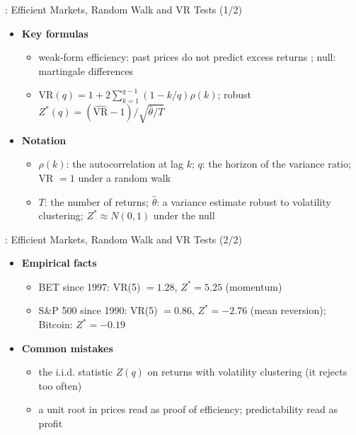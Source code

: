 \begin{frame}{: Efficient Markets, Random Walk and VR Tests (1/2)}
\itemsize{\small}
\begin{itemize}
    \item \textbf{Key formulas}
    \begin{itemize}
        \item weak-form efficiency: past prices do not predict excess returns ; null: martingale differences
        \item $\mathrm{VR}(q) = 1 + 2\sum_{k=1}^{q-1}(1 - k/q)\rho(k)$; robust $Z^*(q) = (\widehat{\mathrm{VR}} - 1)/\sqrt{\hat\theta/T}$ 
    \end{itemize}
    \item \textbf{Notation}
    \begin{itemize}
        \item $\rho(k)$: the autocorrelation at lag $k$; $q$: the horizon of the variance ratio; VR $= 1$ under a random walk
        \item $T$: the number of returns; $\hat\theta$: a variance estimate robust to volatility clustering; $Z^* \approx N(0, 1)$ under the null
    \end{itemize}
\end{itemize}
\end{frame}

\begin{frame}{: Efficient Markets, Random Walk and VR Tests (2/2)}
\itemsize{\small}
\begin{itemize}
    \item \textbf{Empirical facts}
    \begin{itemize}
        \item BET since 1997: VR(5) $= 1.28$, $Z^* = 5.25$ (momentum)
        \item S\&P 500 since 1990: VR(5) $= 0.86$, $Z^* = -2.76$ (mean reversion); Bitcoin: $Z^* = -0.19$
    \end{itemize}
    \item \textbf{Common mistakes}
    \begin{itemize}
        \item the i.i.d. statistic $Z(q)$ on returns with volatility clustering (it rejects too often)
        \item a unit root in prices read as proof of efficiency; predictability read as profit
    \end{itemize}
\end{itemize}
\end{frame}


